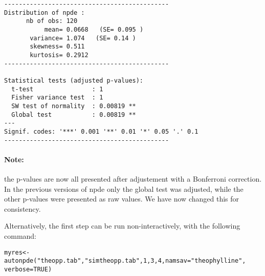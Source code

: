 {\begin{verbatim}
---------------------------------------------
Distribution of npde :
      nb of obs: 120 
           mean= 0.0668   (SE= 0.095 )
       variance= 1.074   (SE= 0.14 )
       skewness= 0.511 
       kurtosis= 0.2912 
---------------------------------------------

Statistical tests (adjusted p-values):
  t-test                : 1
  Fisher variance test  : 1
  SW test of normality  : 0.00819 **
  Global test           : 0.00819 **
---
Signif. codes: '***' 0.001 '**' 0.01 '*' 0.05 '.' 0.1 
---------------------------------------------
\end{verbatim}
}

\paragraph{Note:} the p-values are now all presented after adjustement with a Bonferroni correction. In the previous versions of {\sf npde} only the global test was adjusted, while the other p-values were presented as raw values. We have now changed this for consistency.

% 


\bigskip
Alternatively, the first step can be run non-interactively, with the following command:
\begin{verbatim}
myres<-autonpde("theopp.tab","simtheopp.tab",1,3,4,namsav="theophylline",
verbose=TRUE)
\end{verbatim}


